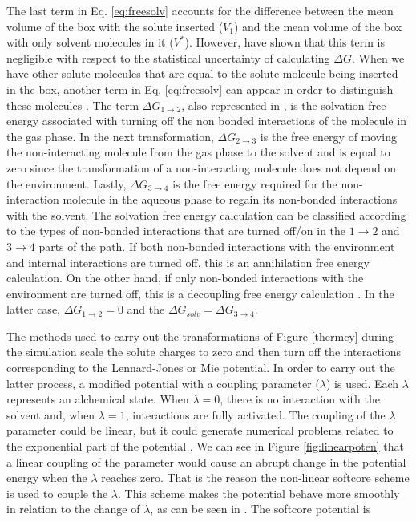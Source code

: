 The last term in Eq. \ref{eq:freesolv} accounts for the difference between the mean volume of the box with the solute inserted ($V_{1}$) and the mean volume of the box with only solvent molecules in it ($V^{*}$). However,  have shown that this term is negligible with respect to the statistical uncertainty of calculating $\Delta G$. When we have other solute molecules that are equal to the solute molecule being inserted in the box, another term in Eq. \ref{eq:freesolv} can appear in order to distinguish these molecules \cite{shirts2013}. The  term $\Delta G_{1 \rightarrow 2}$, also represented in ,  is the solvation free energy associated with turning off the non bonded interactions of the molecule in the gas phase. In the next transformation, $\Delta G_{2 \rightarrow 3}$ is the free energy of moving the non-interacting molecule from the gas phase to the solvent and is equal to zero since the transformation of a non-interacting molecule does not depend on the environment. Lastly, $\Delta G_{3 \rightarrow 4}$ is the free energy required for the non-interaction molecule in the aqueous phase to regain its non-bonded interactions with the solvent.  The solvation free energy calculation can be classified according to the types of non-bonded interactions that are turned off/on in the $1 \rightarrow 2$ and $ 3 \rightarrow 4$ parts of the path. If both non-bonded interactions with the environment and internal interactions are turned off, this is an annihilation free energy calculation. On the other hand, if only non-bonded interactions with the environment are turned off, this is a decoupling free energy calculation \cite{klimovich}. In the latter case, $\Delta G_{1 \rightarrow 2} = 0$ and the $\Delta G_{solv} = \Delta G_{3 \rightarrow 4} $.  

The methods used to carry out the transformations of Figure \ref{thermcy} during the simulation scale the solute charges to zero and then turn off the interactions corresponding to the Lennard-Jones or Mie potential. In order to carry out the latter process, a modified potential with a coupling parameter ($\lambda$) is used. Each $\lambda$ represents an alchemical state. When $\lambda=0$, there is no interaction with the solvent and, when $\lambda=1$, interactions are fully activated. The coupling of the $\lambda$ parameter could be linear, but it could generate numerical problems related to the exponential part of the potential \cite{shirts2013}. We can see in Figure \ref{fig:linearpoten} that a linear coupling of the parameter would cause an abrupt change in the potential energy when the $\lambda$ reaches zero. That is the reason the non-linear softcore scheme \cite{beutler1994} is used to couple the $\lambda$. This scheme makes the potential behave more smoothly in relation to the change of $\lambda$, as can be seen in . The softcore potential is  

